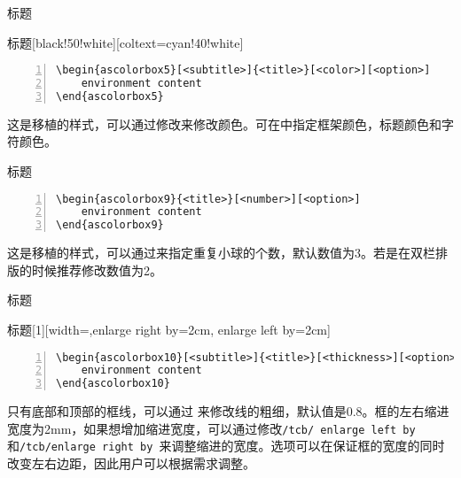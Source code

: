 \begin{ascolorbox5}[子标题]{标题}
    \zhlipsum[1]
\end{ascolorbox5}

\begin{ascolorbox5}[子标题]{标题}[black!50!white][coltext=cyan!40!white]
    \zhlipsum[1]
\end{ascolorbox5}
\begin{lstlisting}[backgroundcolor=\color{gray!5},framerule=1pt,frame=tb,numbers=left,
    numberstyle=\tiny\color{black},]
\begin{ascolorbox5}[<subtitle>]{<title>}[<color>][<option>]
    environment content
\end{ascolorbox5}
\end{lstlisting}
这是移植的样式，可以通过修改\md{[⟨color⟩]}来修改颜色。可在\md{[⟨option⟩]}中指定框架颜色，标题颜色和字符颜色。

\begin{ascolorbox9}{标题}
    \zhlipsum[1]
\end{ascolorbox9}
\begin{lstlisting}[backgroundcolor=\color{gray!5},framerule=1pt,frame=tb,numbers=left,
    numberstyle=\tiny\color{black},]
\begin{ascolorbox9}{<title>}[<number>][<option>]
    environment content
\end{ascolorbox9}
\end{lstlisting}
这是移植的样式，可以通过\md{[⟨number⟩]}来指定重复小球的个数，默认数值为3。若是在双栏排
版的时候推荐修改数值为2。

\begin{ascolorbox10}[子标题]{标题}
    \zhlipsum[1]
\end{ascolorbox10}

\begin{ascolorbox10}[子标题]{标题}[1][width=\linewidth-4cm,enlarge right by=2cm, enlarge left by=2cm]
    \zhlipsum[1]
\end{ascolorbox10}
\begin{lstlisting}[backgroundcolor=\color{gray!5},framerule=1pt,frame=tb,numbers=left,
    numberstyle=\tiny\color{black},]
\begin{ascolorbox10}[<subtitle>]{<title>}[<thickness>][<option>]
    environment content
\end{ascolorbox10}
\end{lstlisting}
只有底部和顶部的框线，可以通过\md{[⟨thickness⟩]} 来修改线的粗细，默认值是0.8。框的左右缩进宽度为2mm，如果想增加缩进宽度，可以通过修改\texttt{/tcb/ enlarge left by }和\texttt{/tcb/enlarge
right by }来调整缩进的宽度。选项可以在保证框的宽度的同时改变左右边距，因此用户可以根据需求调整。


